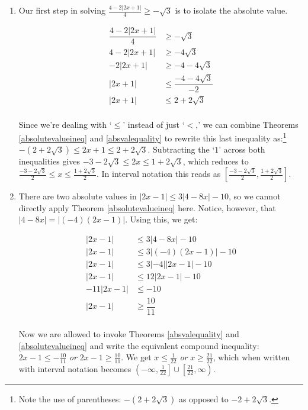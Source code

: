 \begin{ex}
\begin{enumerate}
\item  Our first step in solving $\frac{4 - 2|2x+1|}{4} \geq -\sqrt{3}$ is to isolate the absolute value.

\begin{align*}
\dfrac{4 - 2|2x+1|}{4} & \geq -\sqrt{3} \\
4 - 2|2x+1| & \geq -4\sqrt{3} \tag{Multiply by $4$} \\
- 2|2x+1| & \geq -4-4\sqrt{3} \tag{Subtract $4$} \\
|2x+1| & \leq \dfrac{-4-4\sqrt{3}}{-2} \tag{Divide by $-2$,  reverse the inequality} \\
|2x+1| & \leq 2 + 2\sqrt{3} \tag{Reduce} \\ 
\end{align*}

Since we're dealing with `$\leq$' instead of just `$<$,' we can combine Theorems \ref{absolutevalueineq} and  \ref{absvalequality} to rewrite this last inequality as:\footnote{Note the use of parentheses: $-(2+2\sqrt{3})$ as opposed to $-2 + 2\sqrt{3}$.}   $-(2 + 2\sqrt{3}) \leq 2x+1 \leq 2+2\sqrt{3}$. Subtracting the `$1$' across both inequalities gives $-3-2\sqrt{3} \leq 2x \leq 1 + 2\sqrt{3}$, which reduces to $\frac{-3-2\sqrt{3}}{2} \leq x \leq \frac{1+2\sqrt{3}}{2}$.  In interval notation this reads as  $\left[\frac{-3-2\sqrt{3}}{2}, \frac{1+2\sqrt{3}}{2}\right]$.

\item  There are two absolute values in $|2x - 1| \leq 3|4 - 8x| - 10$, so we cannot directly apply Theorem \ref{absolutevalueineq} here. Notice, however, that $|4 - 8x| = |(-4)(2x-1)|$.   Using this, we get:

\begin{align*}
|2x - 1| & \leq 3|4 - 8x| - 10 \\
|2x - 1| & \leq 3|(-4)(2x-1)| - 10 \tag{Factor} \\
|2x - 1| & \leq 3|-4||2x-1| - 10 \tag{Product Rule} \\
|2x - 1| & \leq 12|2x-1| - 10 \\
-11|2x - 1| & \leq - 10 \tag{Subtract $12|2x-1|$} \\
|2x - 1| & \geq  \dfrac{10}{11} \tag{Divide by $-11$ and reduce} \\
\end{align*}

Now we are allowed to invoke Theorems \ref{absvalequality} and \ref{absolutevalueineq} and write the equivalent compound inequality:  $2x - 1 \leq -\frac{10}{11}$ \textit{or} $2x-1 \geq \frac{10}{11}$.  We get $x \leq \frac{1}{22}$ \textit{or} $x \geq \frac{21}{22}$, which when written with interval notation becomes $\left(-\infty, \frac{1}{22}\right] \cup \left[\frac{21}{22}, \infty\right)$.


\end{enumerate}
\end{ex}
